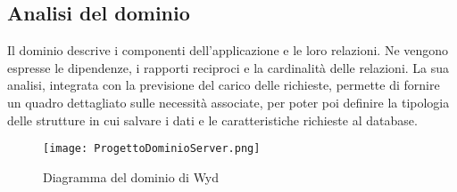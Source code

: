 \subsection{Analisi del dominio}

Il dominio descrive i componenti dell'applicazione e le loro relazioni.
Ne vengono espresse le dipendenze, i rapporti reciproci e la cardinalità delle relazioni.
La sua analisi, integrata con la previsione del carico delle richieste,
permette di fornire un quadro dettagliato sulle necessità associate,
per poter poi definire la tipologia delle strutture in cui salvare i dati e
le caratteristiche richieste al database.\\

\begin{figure}[htpb]
    \centering
    \texttt{[image: ProgettoDominioServer.png]}
    \caption{Diagramma del dominio di Wyd}
\end{figure}

